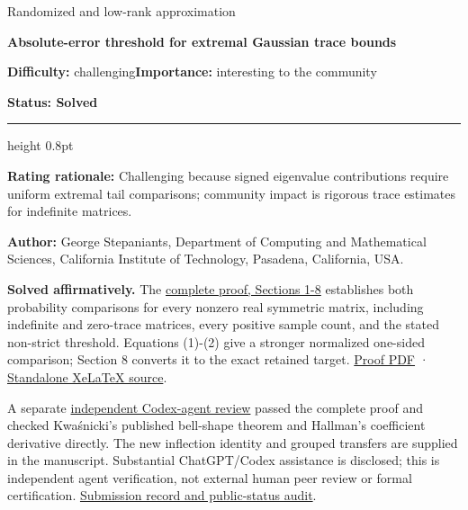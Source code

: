 \documentclass[11pt,a4paper]{article}
\makeatletter
\renewcommand{\subsection}{\Needspace{4\baselineskip}\@startsection{subsection}{2}{0pt}{9pt plus 1pt minus 1pt}{3pt}{\sffamily\bfseries\normalsize\color{ink}}}
\makeatother
\begin{document}
{\sffamily\small\color{muted}Randomized and low-rank approximation\par}
\vspace{3pt}
{\raggedright{}\sffamily\bfseries\fontsize{21}{24}\selectfont\color{ink}Absolute-error
threshold for extremal Gaussian trace bounds\par}
\vspace{7pt}
{\sffamily\small\textbf{Difficulty:} challenging\quad\textbf{Importance:} interesting
to the community\par}
{\sffamily\small\bfseries\color{accent}Status: Solved\par}
\vspace{4pt}
{\color{accent}\hrule height 0.8pt}
\vspace{6pt}
\textbf{Rating rationale:} Challenging because signed eigenvalue
contributions require uniform extremal tail comparisons; community
impact is rigorous trace estimates for indefinite matrices.

\subsection{Resolution - 2026-09-11}\label{resolution---2026-09-11}

\textbf{Author:} George Stepaniants, Department of Computing and
Mathematical Sciences, California Institute of Technology, Pasadena,
California, USA.

\textbf{Solved affirmatively.} The
\href{https://github.com/ajt60gaibb/OpenProblemsInNLA/blob/main/randomized-and-low-rank-approximation/RA-13/solution.md}{complete
proof, Sections 1-8} establishes both probability comparisons for every
nonzero real symmetric matrix, including indefinite and zero-trace
matrices, every positive sample count, and the stated non-strict
threshold. Equations (1)-(2) give a stronger normalized one-sided
comparison; Section 8 converts it to the exact retained target.
\href{https://github.com/ajt60gaibb/OpenProblemsInNLA/blob/main/randomized-and-low-rank-approximation/RA-13/solution.pdf}{Proof
PDF} ·
\href{https://github.com/ajt60gaibb/OpenProblemsInNLA/blob/main/randomized-and-low-rank-approximation/RA-13/solution.tex}{Standalone
XeLaTeX source}.

A separate
\href{https://github.com/ajt60gaibb/OpenProblemsInNLA/blob/main/references/stepaniants-ra13-2026-09-11/verification/RA-13-independent-review.md}{independent
Codex-agent review} passed the complete proof and checked Kwaśnicki's
published bell-shape theorem and Hallman's coefficient derivative
directly. The new inflection identity and grouped transfers are supplied
in the manuscript. Substantial ChatGPT/Codex assistance is disclosed;
this is independent agent verification, not external human peer review
or formal certification.
\href{https://github.com/ajt60gaibb/OpenProblemsInNLA/blob/main/references/stepaniants-ra13-2026-09-11/README.md}{Submission
record and public-status audit}.
\end{document}
